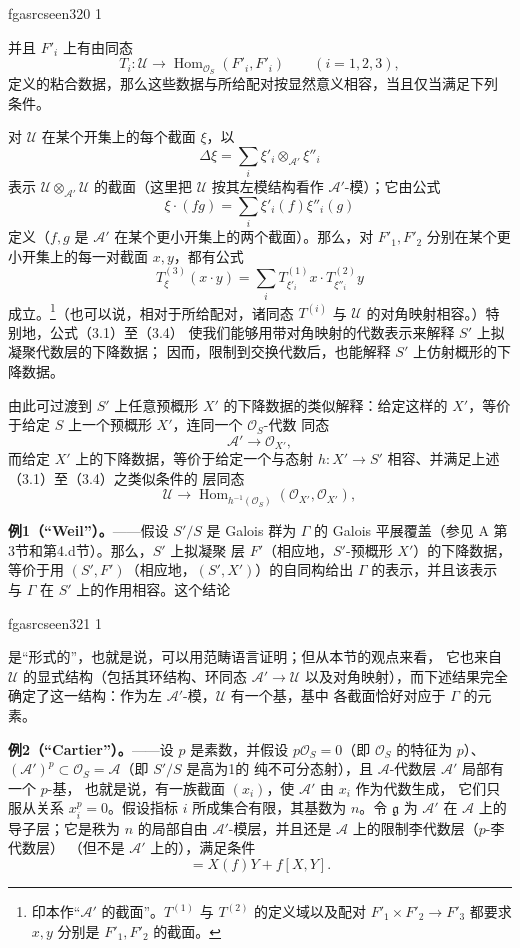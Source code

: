 \documentclass[12pt,twoside,openany]{book}
\numberwithin{equation}{section}
\newcommand{\fgaunitid}{unbound}
\newcommand{\src}[1]{%
  \phantomsection
  \hypertarget{src:\fgaunitid:#1}{}%
  \hypertarget{fga.\fgaunitid.p#1}{}%
  \ifcsname fgasrcseen#1\endcsname\else
    \expandafter\gdef\csname fgasrcseen#1\endcsname{1}%
    \hypertarget{src:#1}{}%
  \fi
  \marginpar{\raggedleft\footnotesize\sffamily #1}%
}
\newcommand{\fquote}[1]{“#1”}
\theoremstyle{plain}
\theoremstyle{definition}
\theoremstyle{remark}
\begin{document}
\src{320}
并且 $F'_i$ 上有由同态
\[
  T_i:\mathcal U\longrightarrow
  \operatorname{Hom}_{\mathcal O_S}(F'_i,F'_i)
  \qquad (i=1,2,3),
\]
定义的粘合数据，那么这些数据与所给配对按显然意义相容，当且仅当满足下列
条件。

对 $\mathcal U$ 在某个开集上的每个截面 $\xi$，以
\[
  \Delta\xi=\sum_i\xi'_i\otimes_{\mathcal A'}\xi''_i
\]
表示 $\mathcal U\otimes_{\mathcal A'}\mathcal U$ 的截面（这里把
$\mathcal U$ 按其左模结构看作 $\mathcal A'$-模）；它由公式
\[
  \xi\mathbin{\cdot}(fg)=\sum_i\xi'_i(f)\xi''_i(g)
\]
定义（$f,g$ 是 $\mathcal A'$ 在某个更小开集上的两个截面）。那么，对
$F'_1,F'_2$ 分别在某个更小开集上的每一对截面 $x,y$，都有公式
\begin{equation}
  T^{(3)}_\xi(x\mathbin{\cdot}y)
  =\sum_iT^{(1)}_{\xi'_i}x\mathbin{\cdot}T^{(2)}_{\xi''_i}y
  \tag{3.4}
\end{equation}
成立。\footnote{印本作\fquote{$\mathcal A'$ 的截面}。$T^{(1)}$ 与
$T^{(2)}$ 的定义域以及配对 $F'_1\times F'_2\longrightarrow F'_3$ 都要求
$x,y$ 分别是 $F'_1,F'_2$ 的截面。}（也可以说，相对于所给配对，诸同态
$T^{(i)}$ 与 $\mathcal U$ 的对角映射相容。）特别地，公式（3.1）至（3.4）
使我们能够用带对角映射的代数表示来解释 $S'$ 上拟凝聚代数层的下降数据；
因而，限制到交换代数后，也能解释 $S'$ 上仿射概形的下降数据。

由此可过渡到 $S'$ 上任意预概形 $X'$ 的下降数据的类似解释：给定这样的
$X'$，等价于给定 $S$ 上一个预概形 $X'$，连同一个 $\mathcal O_S$-代数
同态
\[
  \mathcal A'\longrightarrow\mathcal O_{X'},
\]
而给定 $X'$ 上的下降数据，等价于给定一个与态射
$h:X'\longrightarrow S'$ 相容、并满足上述（3.1）至（3.4）之类似条件的
层同态
\[
  \mathcal U\longrightarrow
  \operatorname{Hom}_{h^{-1}(\mathcal O_S)}
  (\mathcal O_{X'},\mathcal O_{X'}),
\]

\textbf{例1（\fquote{Weil}）。}——假设 $S'/S$ 是 Galois 群为
$\Gamma$ 的 Galois 平展覆盖（参见 A 第3节和第4.d节）。那么，$S'$ 上拟凝聚
层 $F'$（相应地，$S'$-预概形 $X'$）的下降数据，等价于用
$(S',F')$（相应地，$(S',X')$）的自同构给出 $\Gamma$ 的表示，并且该表示
与 $\Gamma$ 在 $S'$ 上的作用相容。这个结论

\src{321}
是\fquote{形式的}，也就是说，可以用范畴语言证明；但从本节的观点来看，
它也来自 $\mathcal U$ 的显式结构（包括其环结构、环同态
$\mathcal A'\longrightarrow\mathcal U$ 以及对角映射），而下述结果完全
确定了这一结构：作为左 $\mathcal A'$-模，$\mathcal U$ 有一个基，基中
各截面恰好对应于 $\Gamma$ 的元素。

\textbf{例2（\fquote{Cartier}）。}——设 $p$ 是素数，并假设
$p\mathcal O_S=0$（即 $\mathcal O_S$ 的特征为 $p$）、
$(\mathcal A')^p\subset\mathcal O_S=\mathcal A$（即 $S'/S$ 是高为1的
纯不可分态射），且 $\mathcal A$-代数层 $\mathcal A'$ 局部有一个 $p$-基，
也就是说，有一族截面 $(x_i)$，使 $\mathcal A'$ 由 $x_i$ 作为代数生成，
它们只服从关系 $x_i^p=0$。假设指标 $i$ 所成集合有限，其基数为 $n$。令
$\mathfrak g$ 为 $\mathcal A'$ 在 $\mathcal A$ 上的导子层；它是秩为 $n$
的局部自由 $\mathcal A'$-模层，并且还是 $\mathcal A$ 上的限制李代数层（$p$-李代数层）
（但不是 $\mathcal A'$ 上的），满足条件
\begin{equation}
  [X,fY]=X(f)Y+f[X,Y].
  \tag{3.5}
\end{equation}
\end{document}
